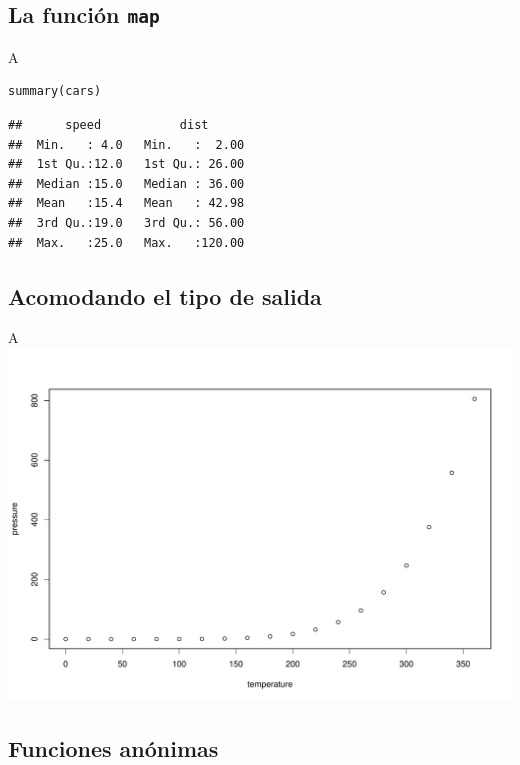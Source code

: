 \documentclass[ignorenonframetext,]{beamer}
\begin{document}
\hypertarget{la-funciuxf3n}{%
\subsection{\texorpdfstring{La función
\texttt{map}}{La función }}\label{la-funciuxf3n}}

\begin{frame}[fragile]{A}
\protect\hypertarget{a-2}{}
\begin{lstlisting}[style=codechunk]
summary(cars)
\end{lstlisting}

\begin{verbatim}
##      speed           dist       
##  Min.   : 4.0   Min.   :  2.00  
##  1st Qu.:12.0   1st Qu.: 26.00  
##  Median :15.0   Median : 36.00  
##  Mean   :15.4   Mean   : 42.98  
##  3rd Qu.:19.0   3rd Qu.: 56.00  
##  Max.   :25.0   Max.   :120.00
\end{verbatim}
\end{frame}

\hypertarget{acomodando-el-tipo-de-salida}{%
\subsection{Acomodando el tipo de
salida}\label{acomodando-el-tipo-de-salida}}

\begin{frame}{A}
\protect\hypertarget{a-3}{}
\includegraphics{Purrr_files/figure-beamer/pressure-1.pdf}
\end{frame}

\hypertarget{funciones-anuxf3nimas}{%
\subsection{Funciones anónimas}\label{funciones-anuxf3nimas}}
\end{document}
